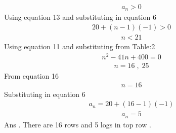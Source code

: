 \documentclass[journal,12pt,twocolumn]{IEEEtran}
\theoremstyle{remark}
\begin{document}
    
\begin{align}a_n>0\end{align}
Using equation 13 and substituting in equation 6
\begin{align}20+(n-1)(-1)>0\end{align}
\begin{align}n<21\end{align}
Using equation 11 and substituting from Table:2
\begin{align}n^2-41 n +400 = 0\end{align}
\begin{align}n=16\; ,\;25\end{align}
From equation 16 
\begin{align}n=16\end{align}
Substituting in equation 6
\begin{align}a_n=20+(16-1)(-1)\end{align}
\begin{align}a_n=5\end{align}
Ans . There are 16 rows and 5 logs in top row .
\end{document}
